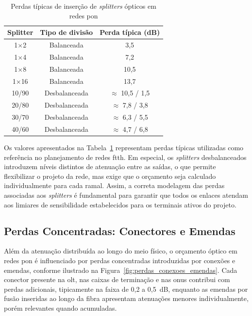 \begin{table}[ht!]
\centering
\caption{Perdas típicas de inserção de \textit{splitters} ópticos em redes \gls{pon}}
\label{tab:perdas_splitters}
\begin{tabular}{c c c}
\hline
\textbf{Splitter} & \textbf{Tipo de divisão} & \textbf{Perda típica (dB)} \\
\hline
1$\times$2   & Balanceada     & 3,5 \\
1$\times$4   & Balanceada     & 7,2 \\
1$\times$8   & Balanceada     & 10,5 \\
1$\times$16  & Balanceada     & 13,7 \\
\hline
10/90 & Desbalanceada & $\approx$ 10,5 / 1,5 \\
20/80 & Desbalanceada & $\approx$ 7,8 / 3,8 \\
30/70 & Desbalanceada & $\approx$ 6,3 / 5,5 \\
40/60 & Desbalanceada & $\approx$ 4,7 / 6,8 \\
\hline
\end{tabular}
\end{table} 

Os valores apresentados na Tabela~\ref{tab:perdas_splitters} representam perdas típicas utilizadas como referência no planejamento de redes \gls{ftth}. Em especial, os \textit{splitters} desbalanceados introduzem níveis distintos de atenuação entre as saídas, o que permite flexibilizar o projeto da rede, mas exige que o orçamento seja calculado individualmente para cada ramal. Assim, a correta modelagem das perdas associadas aos \textit{splitters} é fundamental para garantir que todos os enlaces atendam aos limiares de sensibilidade estabelecidos para os terminais ativos do projeto.

\subsection{Perdas Concentradas: Conectores e Emendas}

Além da atenuação distribuída ao longo do meio físico, o orçamento óptico em redes \gls{pon} é influenciado por perdas concentradas introduzidas por conexões e emendas, conforme ilustrado na Figura~\ref{fig:perdas_conexoes_emendas}. Cada conector  presente na \gls{olt}, nas caixas de terminação e nas \glspl{onu} contribui com perdas adicionais, tipicamente na faixa de 0,2 a 0,5~dB, enquanto as emendas por fusão inseridas ao longo da fibra apresentam atenuações menores individualmente, porém relevantes quando acumuladas. 

